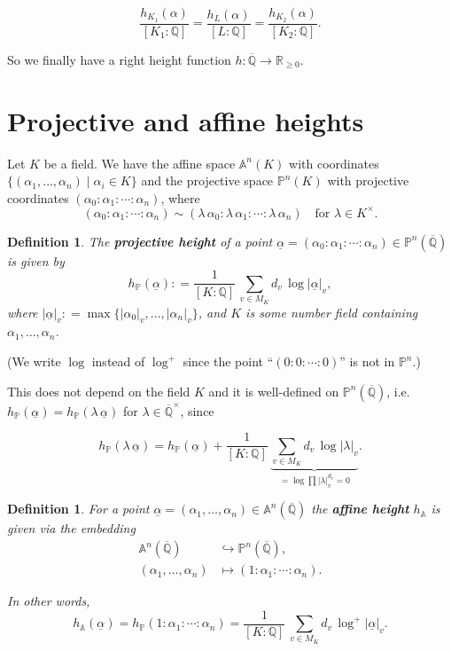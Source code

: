 \documentclass{article}
\newcommand{\term}{\textbf}
\newcommand{\dfn}{\mathrel{\mathop:}=}
\newcommand{\QQ}{\mathbb{Q}}
\theoremstyle{myplain}
\theoremstyle{mydefinition}
\newtheorem{definition}[proposition]{Definition}
\begin{document}
\[ \frac{h_{K_1} (\alpha)}{[K_1 : \QQ]} =
  \frac{h_L (\alpha)}{[L : \QQ]} =
  \frac{h_{K_2} (\alpha)}{[K_2 : \QQ]}. \]

So we finally have a right height function
$h\colon \overline{\QQ} \to \mathbb{R}_{\ge 0}$.

\section{Projective and affine heights}

Let $K$ be a field. We have the affine space $\mathbb{A}^n (K)$ with coordinates
$\{ (\alpha_1, \ldots, \alpha_n) \mid \alpha_i \in K \}$ and the projective
space $\mathbb{P}^n (K)$ with projective coordinates
$(\alpha_0 : \alpha_1 : \cdots : \alpha_n)$, where
\[ (\alpha_0 : \alpha_1 : \cdots : \alpha_n) \sim
  (\lambda\,\alpha_0 : \lambda\,\alpha_1 : \cdots : \lambda\,\alpha_n)
  \quad \text{for }\lambda \in K^\times. \]

\begin{definition}
  The \term{projective height} of a point
  $\underline{\alpha} = (\alpha_0 : \alpha_1 : \cdots : \alpha_n) \in
  \mathbb{P}^n (\overline{\QQ})$ is given by
  \[ h_\mathbb{P} (\underline{\alpha}) \dfn
    \frac{1}{[K : \QQ]} \, \sum_{v \in M_K} d_v \, \log |\underline{\alpha}|_v, \]
  where
  $|\underline{\alpha}|_v \dfn \max \{ |\alpha_0|_v, \ldots, |\alpha_n|_v \}$,
  and $K$ is some number field containing $\alpha_1, \ldots, \alpha_n$.
\end{definition}

\noindent (We write $\log$ instead of $\log^+$ since the point
``$(0 : 0 : \cdots : 0)$'' is not in $\mathbb{P}^n$.)

This does not depend on the field $K$ and it is well-defined on
$\mathbb{P}^n (\overline{\QQ})$, i.e.
$h_\mathbb{P} (\underline{\alpha}) = h_\mathbb{P} (\lambda \, \underline{\alpha})$
for $\lambda \in \overline{\QQ}^\times$, since

\[ h_\mathbb{P} (\lambda\,\underline{\alpha}) =
  h_\mathbb{P} (\underline{\alpha}) +
  \frac{1}{[K:\QQ]} \, \underbrace{\sum_{v\in M_K} d_v \, \log |\lambda|_v}_{= \log \prod |\lambda|_v^{d_v} = 0}. \]

\begin{definition}
  For a point
  $\underline{\alpha} = (\alpha_1, \ldots, \alpha_n) \in \mathbb{A}^n
  (\overline{\QQ})$ the \term{affine height} $h_\mathbb{A}$ is given via the
  embedding
  \begin{align*}
    \mathbb{A}^n (\overline{\QQ}) & \hookrightarrow \mathbb{P}^n (\overline{\QQ}), \\
    (\alpha_1, \ldots, \alpha_n) & \mapsto (1 : \alpha_1 : \cdots : \alpha_n).
  \end{align*}

  In other words,
  \[ h_\mathbb{A} (\underline{\alpha}) =
    h_\mathbb{P} (1 : \alpha_1 : \cdots : \alpha_n) =
    \frac{1}{[K:\QQ]} \, \sum_{v\in M_K} d_v \, \log^+ |\underline{\alpha}|_v. \]
\end{definition}
\end{document}
